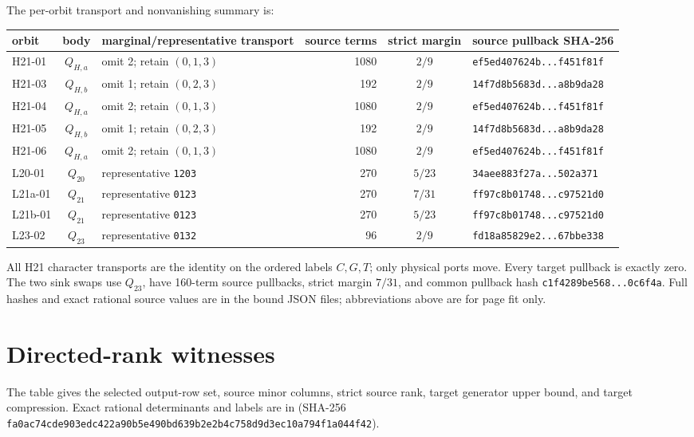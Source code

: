 \documentclass[10pt]{article}
\newcommand{\sha}[1]{\nolinkurl{#1}}
\begin{document}
The per-orbit transport and nonvanishing summary is:

\begingroup
\scriptsize
\setlength{\tabcolsep}{3pt}
\begin{longtable}{lcL{.25\linewidth}rcL{.19\linewidth}}
\toprule
orbit & body & marginal/representative transport & source terms & strict margin & source pullback SHA-256\\
\midrule
\endhead
H21-01 & \(Q_{H,a}\)& omit 2; retain \((0,1,3)\)&1080&\(2/9\)&\sha{ef5ed407624b...f451f81f}\\
H21-03 & \(Q_{H,b}\)& omit 1; retain \((0,2,3)\)&192&\(2/9\)&\sha{14f7d8b5683d...a8b9da28}\\
H21-04 & \(Q_{H,a}\)& omit 2; retain \((0,1,3)\)&1080&\(2/9\)&\sha{ef5ed407624b...f451f81f}\\
H21-05 & \(Q_{H,b}\)& omit 1; retain \((0,2,3)\)&192&\(2/9\)&\sha{14f7d8b5683d...a8b9da28}\\
H21-06 & \(Q_{H,a}\)& omit 2; retain \((0,1,3)\)&1080&\(2/9\)&\sha{ef5ed407624b...f451f81f}\\
L20-01 & \(Q_{20}\)& representative \texttt{1203}&270&\(5/23\)&\sha{34aee883f27a...502a371}\\
L21a-01 & \(Q_{21}\)& representative \texttt{0123}&270&\(7/31\)&\sha{ff97c8b01748...c97521d0}\\
L21b-01 & \(Q_{21}\)& representative \texttt{0123}&270&\(5/23\)&\sha{ff97c8b01748...c97521d0}\\
L23-02 & \(Q_{23}\)& representative \texttt{0132}&96&\(2/9\)&\sha{fd18a85829e2...67bbe338}\\
\bottomrule
\end{longtable}
\endgroup

All H21 character transports are the identity on the ordered labels
\(C,G,T\); only physical ports move.  Every target pullback is exactly zero.
The two sink swaps use \(Q_{23}\), have 160-term source pullbacks,
strict margin \(7/31\), and common pullback hash
\sha{c1f4289be568...0c6f4a}.  Full hashes and exact rational source values are
in the bound JSON files; abbreviations above are for page fit only.

\section{Directed-rank witnesses}

The table gives the selected output-row set, source minor columns, strict
source rank, target generator upper bound, and target compression.  Exact
rational determinants and labels are in
(SHA-256 \sha{fa0ac74cde903edc422a90b5e490bd639b2e2b4c758d9d3ec10a794f1a044f42}).
\end{document}
